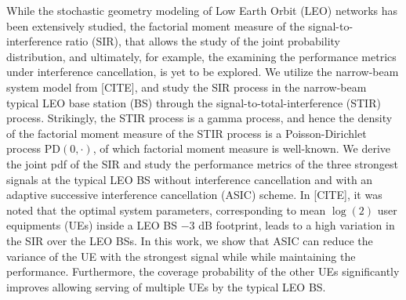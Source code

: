 \documentclass[lettersize,journal]{IEEEtran}
\begin{document}
While the stochastic geometry modeling of Low Earth Orbit (LEO) networks has been extensively studied, the factorial moment measure of the signal-to-interference ratio (SIR), that allows the study of the joint probability distribution, and ultimately, for example, the examining the performance metrics under interference cancellation, is yet to be explored. We utilize the narrow-beam system model from [CITE], and study the SIR process in the narrow-beam typical LEO base station (BS) through the signal-to-total-interference (STIR) process. Strikingly, the STIR process is a gamma process, and hence the density of the factorial moment measure of the STIR process is a Poisson-Dirichlet process PD$(0,\cdot)$, of which factorial moment measure is well-known. We derive the joint pdf of the SIR and study the performance metrics of the three strongest signals at the typical LEO BS without interference cancellation and with an adaptive successive interference cancellation (ASIC) scheme.  In [CITE], it was noted that the optimal system parameters, corresponding to mean $\log(2)$ user equipments (UEs) inside a LEO BS $-3$ dB footprint, leads to a high variation in the SIR over the LEO BSs. In this work, we show that ASIC can reduce the variance of the UE with the strongest signal while while maintaining the performance. Furthermore, the coverage probability of the other UEs significantly improves allowing serving of multiple UEs by the typical LEO BS.
\end{document}
